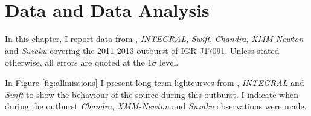 \section{Data and Data Analysis}

\label{sec:dex}

\par In this chapter, I report data from \indexrxte\rxte, \indexintegral\textit{INTEGRAL}, \indexswift\textit{Swift}, \indexchandra\textit{Chandra}, \indexxmm\textit{XMM-Newton} and \indexsuzaku\textit{Suzaku} covering the 2011-2013 outburst of IGR J17091.  Unless stated otherwise, all errors are quoted at the 1$\sigma$ level.
\par In Figure \ref{fig:allmissions} I present long-term lightcurves from \rxte ,  \textit{INTEGRAL} and \textit{Swift} to show the behaviour of the source during this outburst.  I indicate when during the outburst \textit{Chandra}, \textit{XMM-Newton} and \textit{Suzaku} observations were made.

